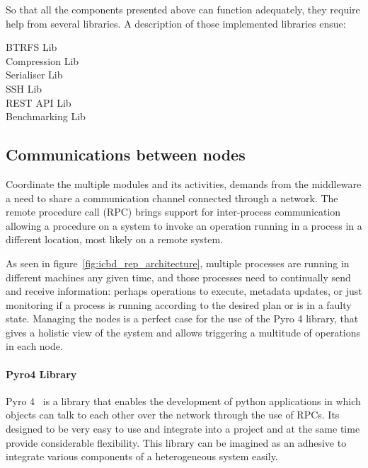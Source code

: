 So that all the components presented above can function adequately, they require help from several libraries. A description of those implemented libraries ensue:

\begin{description}
	\item [BTRFS Lib]
	\item [Compression Lib]
	\item [Serialiser Lib]
	\item [SSH Lib]
	\item [REST API Lib]
	\item [Benchmarking Lib]
\end{description}



\subsection{Communications between nodes}
\label{sub:rep_comms}

Coordinate the multiple modules and its activities, demands from the middleware a need to share a communication channel connected through a network. 
The remote procedure call (RPC) brings support for inter-process communication allowing a procedure on a system to invoke an operation running in a process in a different location, most likely on a remote system.

As seen in figure~\ref{fig:icbd_rep_architecture}, multiple processes are running in different machines any given time, and those processes need to continually send and receive information: perhaps operations to execute, metadata updates, or just monitoring if a process is running according to the desired plan or is in a faulty state.
Managing the nodes is a perfect case for the use of the Pyro 4 library, that gives a holistic view of the system and allows triggering a multitude of operations in each node.


\paragraph{Pyro4 Library}
\label{par:rep_pyro4}
Pyro 4~\cite{pyro4} is a library that enables the development of python applications in which objects can talk to each other over the network through the use of RPCs. Its designed to be very easy to use and integrate into a project and at the same time provide considerable flexibility. This library can be imagined as an adhesive to integrate various components of a heterogeneous system easily.

